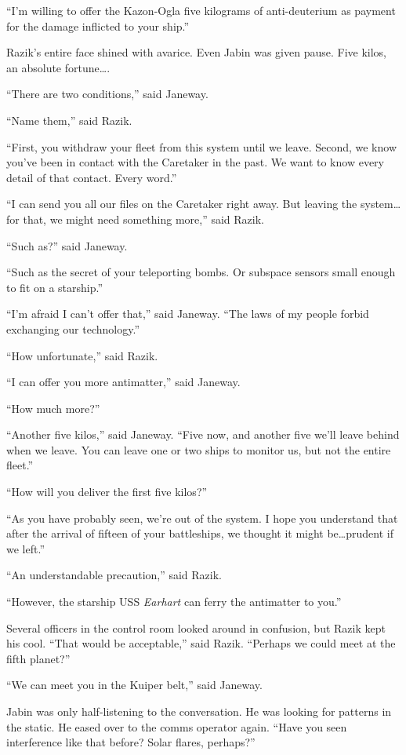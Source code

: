 \documentclass[twoside,letterpaper,12pt]{memoir}
\begin{document}
``I'm willing to offer the Kazon-Ogla five kilograms of anti-deuterium as payment for the damage inflicted to your ship.''

Razik's entire face shined with avarice. Even Jabin was given pause. Five kilos, an absolute fortune\ldots .

``There are two conditions,'' said Janeway.

``Name them,'' said Razik.

``First, you withdraw your fleet from this system until we leave. Second, we know you've been in contact with the Caretaker in the past. We want to know every detail of that contact. Every word.''

``I can send you all our files on the Caretaker right away. But leaving the system\ldots for that, we might need something more,'' said Razik.

``Such as?'' said Janeway.

``Such as the secret of your teleporting bombs. Or subspace sensors small enough to fit on a starship.''

``I'm afraid I can't offer that,'' said Janeway. ``The laws of my people forbid exchanging our technology.''

``How unfortunate,'' said Razik.

``I can offer you more antimatter,'' said Janeway.

``How much more?''

``Another five kilos,'' said Janeway. ``Five now, and another five we'll leave behind when we leave. You can leave one or two ships to monitor us, but not the entire fleet.''

``How will you deliver the first five kilos?''

``As you have probably seen, we're out of the system. I hope you understand that after the arrival of fifteen of your battleships, we thought it might be\ldots prudent if we left.''

``An understandable precaution,'' said Razik.

``However, the starship USS \textit{Earhart} can ferry the antimatter to you.''

Several officers in the control room looked around in confusion, but Razik kept his cool. ``That would be acceptable,'' said Razik. ``Perhaps we could meet at the fifth planet?''

``We can meet you in the Kuiper belt,'' said Janeway.

Jabin was only half-listening to the conversation. He was looking for patterns in the static. He eased over to the comms operator again. ``Have you seen interference like that before? Solar flares, perhaps?''
\end{document}
